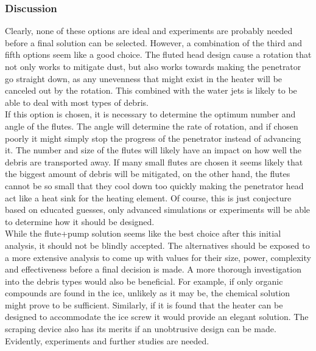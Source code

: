 \subsubsection{Discussion}
Clearly, none of these options are ideal and experiments are probably needed before a final solution can be selected. However, a combination of the third and fifth options seem like a good choice. The fluted head design cause a rotation that not only works to mitigate dust, but also works towards making the penetrator go straight down, as any unevenness that might exist in the heater will be canceled out by the rotation. This combined with the water jets is likely to be able to deal with most types of debris. \\

\noindent
If this option is chosen, it is necessary to determine the optimum number and angle of the flutes. The angle will determine the rate of rotation, and if chosen poorly it might simply stop the progress of the penetrator instead of advancing it. The number and size of the flutes will likely have an impact on how well the debris are transported away. If many small flutes are chosen it seems likely that the biggest amount of debris will be mitigated, on the other hand, the flutes cannot be so small that they cool down too quickly making the penetrator head act like a heat sink for the heating element. Of course, this is just conjecture based on educated guesses, only advanced simulations or experiments will be able to determine how it should be designed.\\

\noindent
While the flute+pump solution seems like the best choice after this initial analysis, it should not be blindly accepted. The alternatives should be exposed to a more extensive analysis to come up with values for their size, power, complexity and effectiveness before a final decision is made. A more thorough investigation into the debris types would also be beneficial. For example, if only organic compounds are found in the ice, unlikely as it may be, the chemical solution might prove to be sufficient. Similarly, if it is found that the heater can be designed to accommodate the ice screw it would provide an elegant solution. The scraping device also has its merits if an unobtrusive design can be made.\\

\noindent
Evidently, experiments and further studies are needed.   







